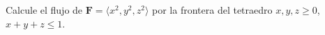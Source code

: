 ﻿Calcule el flujo de $\mathbf F=\langle x^2,y^2,z^2\rangle$ por la frontera del tetraedro $x,y,z\geq0$, $x+y+z\leq1$.
